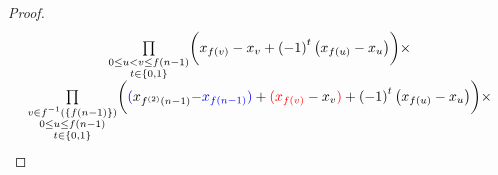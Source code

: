 \begin{proof}
\[\begin{array}{c}
\underset{
    \substack{
        0 \le u < v \le f\left(n-1\right) \\
        t \in \left\{ 0, 1 \right\}
    }
}{\prod}
\bigg( 
    x_{f\left(v\right)} - x_{v} 
    + \left(-1\right)^{t} 
    \big(x_{f\left(u\right)} - x_{u}\big) 
\bigg) \times \\[10pt]

\underset{
    \substack{
        v \in f^{-1}\left(\left\{ f\left(n-1\right)\right\} \right) \\
        0 \le u \le f\left(n-1\right) \\
        t \in \left\{ 0, 1 \right\}
    }
}{\prod}
\bigg(
    {\color{blue}(}x_{f^{\left(2\right)}\left(n-1\right)} 
    {\color{blue}- x_{f\left(n-1\right)}}{\color{blue})} 
    + {\color{red}(x_{f\left(v\right)}} - x_{v}{\color{red})} 
    + \left(-1\right)^{t} 
    \big(x_{f\left(u\right)} - x_{u}\big) 
\bigg) \times \\[10pt]


\end{array}\]
\end{proof}
